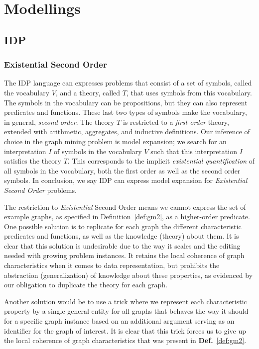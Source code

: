\documentclass{article}
\theoremstyle{definition}
\begin{document}
\section{Modellings}
\subsection{IDP}
\subsubsection{Existential Second Order}
The IDP language can expresses problems that consist of a set of symbols, called the vocabulary $V$, and a theory, called $T$, that uses symbols from this vocabulary.
The symbols in the vocabulary can be propositions, but they can also represent predicates and functions.
These last two types of symbols make the vocabulary, in general, \emph{second order}.
The theory $T$ is restricted to a \emph{first order} theory, extended with arithmetic, aggregates, and inductive definitions.
Our inference of choice in the graph mining problem is model expansion; we search for an interpretation $I$ of symbols in the vocabulary $V$ such that this interpretation $I$ satisfies the theory $T$.
This corresponds to the implicit \emph{existential quantification} of all symbols in the vocabulary, both the first order as well as the second order symbols.
In conclusion, we say IDP can express model expansion for \emph{Existential Second Order} problems. 


The restriction to \emph{Existential} Second Order means we cannot express the set of example graphs, as specified in Definition~\ref{def:gm2}, as a higher-order predicate.
One possible solution is to replicate for each graph the different characteristic predicates and functions, as well as the knowledge (theory) about them.
It is clear that this solution is undesirable due to the way it scales and the editing needed with growing problem instances.
It retains the local coherence of graph characteristics when it comes to data representation, but prohibits the abstraction (generalization) of knowledge about these properties, as evidenced by our obligation to duplicate the theory for each graph.

Another solution would be to use a trick where we represent each characteristic property by a single general entity for all graphs that behaves the way it should for a specific graph instance based on an additional argument serving as an identifier for the graph of interest.
It is clear that this trick forces us to give up the local coherence of graph characteristics that was present in \textbf{Def.}~\ref{def:gm2}.
\end{document}
